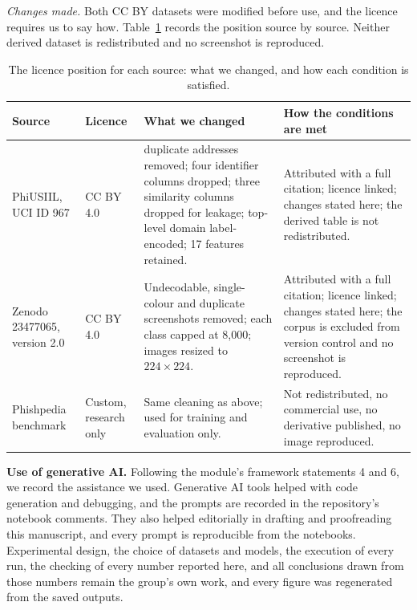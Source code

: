 \documentclass[11pt,journal,a4paper]{IEEEtran}
\newcommand{\tabfont}{\fontsize{11}{13}\selectfont}
\begin{document}
\emph{Changes made.} Both CC BY datasets were modified before use, and the licence requires us to say how.
Table~\ref{tab:licence} records the position source by source. Neither derived dataset is redistributed and no
screenshot is reproduced.

\begin{table}[!ht]
\centering
\caption{The licence position for each source: what we changed, and how each condition is satisfied.}
\label{tab:licence}
\tabfont
\setlength{\tabcolsep}{4pt}
\begin{tabular}{@{}>{\raggedright\arraybackslash}p{2.5cm}>{\raggedright\arraybackslash}p{2.5cm}>{\raggedright\arraybackslash}p{4.6cm}>{\raggedright\arraybackslash}p{5.4cm}@{}}
\toprule
\textbf{Source} & \textbf{Licence} & \textbf{What we changed} & \textbf{How the conditions are met} \\
\midrule
PhiUSIIL, UCI ID 967 \cite{prasad2024phiusiil} & CC BY 4.0 &
425 duplicate addresses removed; four identifier columns dropped; three similarity columns dropped for leakage;
top-level domain label-encoded; 17 features retained. &
Attributed with a full citation; licence linked; changes stated here; the derived table is not redistributed. \\
\addlinespace
Zenodo 23477065, version 2.0 \cite{yadav2026zenodo} & CC BY 4.0 &
Undecodable, single-colour and duplicate screenshots removed; each class capped at 8{,}000; images resized to
$224\times224$. &
Attributed with a full citation; licence linked; changes stated here; the corpus is excluded from version control
and no screenshot is reproduced. \\
\addlinespace
Phishpedia benchmark \cite{lin2021phishpedia} & Custom, research only &
Same cleaning as above; used for training and evaluation only. &
Not redistributed, no commercial use, no derivative published, no image reproduced. \\
\bottomrule
\end{tabular}
\end{table}

\textbf{Use of generative AI.} Following the module's framework statements 4 and 6, we record the assistance we
used. Generative AI tools helped with code generation and debugging, and the prompts are recorded in the
repository's notebook comments. They also helped editorially in drafting and proofreading this manuscript, and
every prompt is reproducible from the notebooks. Experimental design, the choice of datasets and models, the execution of every run, the checking of every number reported here, and all conclusions drawn from those numbers
remain the group's own work, and every figure was regenerated from the saved outputs.
\end{document}
